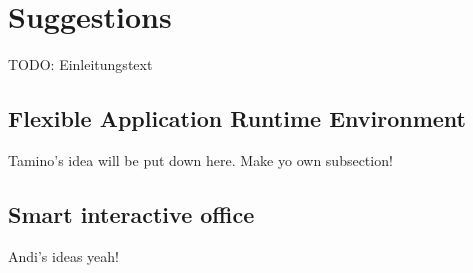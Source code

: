 \section{Suggestions}

TODO: Einleitungstext

\subsection{Flexible Application Runtime Environment}

Tamino's idea will be put down here.
Make yo own subsection!

\subsection{Smart interactive office}
Andi's ideas yeah!